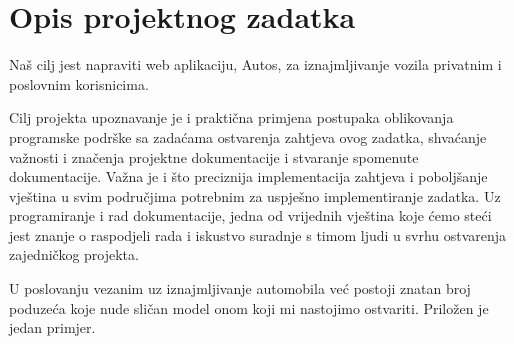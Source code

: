 \chapter{Opis projektnog zadatka}
		
		
		
		 \text Naš cilj jest napraviti web aplikaciju, Autos, za iznajmljivanje vozila privatnim i poslovnim korisnicima. \par 
		 \text Cilj projekta upoznavanje je i praktična primjena postupaka oblikovanja programske podrške sa zadaćama ostvarenja zahtjeva ovog zadatka, shvaćanje važnosti i značenja projektne dokumentacije i stvaranje spomenute dokumentacije. Važna je i što preciznija implementacija zahtjeva i poboljšanje vještina u svim područjima potrebnim za uspješno implementiranje zadatka. Uz programiranje i rad dokumentacije, jedna od vrijednih vještina koje ćemo steći jest znanje o raspodjeli rada i iskustvo suradnje s timom ljudi u svrhu ostvarenja zajedničkog projekta. \par 
		 \text U poslovanju vezanim uz iznajmljivanje automobila već postoji znatan broj poduzeća koje nude sličan model onom koji mi nastojimo ostvariti. Priložen je jedan primjer. \par 
		 
